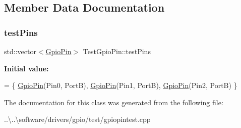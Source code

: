 \subsection{Member Data Documentation}
\mbox{\label{class_test_gpio_pin_a9f11ed851f5dc2f0a9d73a8176c58560}} 
\subsubsection{\texorpdfstring{test\+Pins}{testPins}}
{\footnotesize\ttfamily std\+::vector$<$\mbox{\hyperlink{class_gpio_pin}{Gpio\+Pin}}$>$ Test\+Gpio\+Pin\+::test\+Pins}

{\bfseries Initial value\+:}
\begin{DoxyCode}
= \{ \mbox{\hyperlink{class_gpio_pin}{GpioPin}}(Pin0, PortB),
        \mbox{\hyperlink{class_gpio_pin}{GpioPin}}(Pin1, PortB), \mbox{\hyperlink{class_gpio_pin}{GpioPin}}(Pin2, PortB) \}
\end{DoxyCode}


The documentation for this class was generated from the following file\+:\begin{DoxyCompactItemize}
\item 
..\textbackslash{}..\textbackslash{}software/drivers/gpio/test/gpiopintest.\+cpp\end{DoxyCompactItemize}
